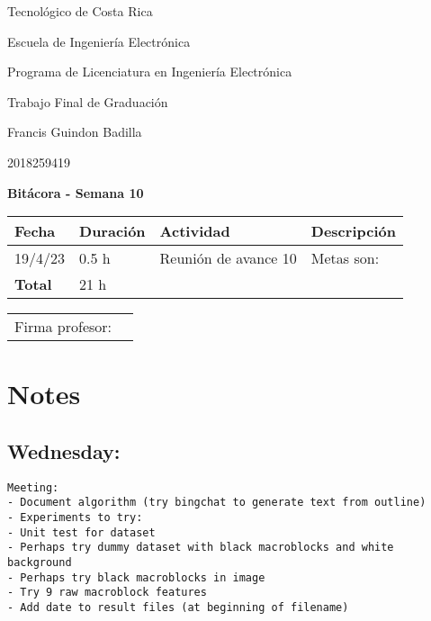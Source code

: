 \documentclass[12pt,oneside]{book}
\begin{document}
 \graphicspath{{./}{../tesis/fig/}}
  Tecnológico de Costa Rica
  \par\vspace{1mm}
  Escuela de Ingeniería Electrónica
  \par\vspace{1mm}
  Programa de Licenciatura en Ingeniería Electrónica
  \par\vspace{10mm}
  Trabajo Final de Graduación
  \par\vspace{1mm}
  Francis Guindon Badilla
  \par\vspace{1mm}
  2018259419
  \par\vspace{10mm}
  \large\textbf{Bitácora - Semana 10}
  \par\vspace{10mm}
  \small

  \begin{table} [!h]
    \centering
    \small
    \begin{tabular}{p{1.5 cm} p{2.1 cm} p{5 cm} p{8 cm}}
      \hline
      Fecha & Duración & Actividad & Descripción \\
      \hline
      19/4/23 & 0.5 h & Reunión de avance 10 & Metas son:  \\
      \hline
      \textbf{Total} & 21 h \\
      \hline
    \end{tabular}
  \end{table}
  
  \vfill

  \begin{tabular}{p{3 cm} p{10 cm}}
    Firma profesor: & \\
    \cline{2-2}
  \end{tabular}

  \newpage

  \section*{Notes}
  \setlength\parindent{0pt}

\subsection*{Wednesday:}
\begin{lstlisting}
Meeting:
- Document algorithm (try bingchat to generate text from outline)
- Experiments to try:
- Unit test for dataset
- Perhaps try dummy dataset with black macroblocks and white background
- Perhaps try black macroblocks in image
- Try 9 raw macroblock features
- Add date to result files (at beginning of filename)
\end{lstlisting}
\end{document}
